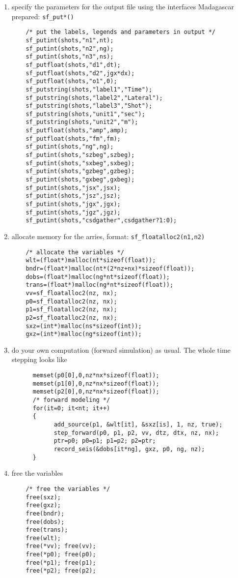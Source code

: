 \begin{enumerate}
 
 \item specify the parameters for the output file using the interfaces Madagascar prepared: \texttt{sf\_put*()}
 \begin{verbatim}
  	/* put the labels, legends and parameters in output */
	sf_putint(shots,"n1",nt);	
	sf_putint(shots,"n2",ng);
	sf_putint(shots,"n3",ns);
	sf_putfloat(shots,"d1",dt);
	sf_putfloat(shots,"d2",jgx*dx);
	sf_putfloat(shots,"o1",0);
	sf_putstring(shots,"label1","Time");
	sf_putstring(shots,"label2","Lateral");
	sf_putstring(shots,"label3","Shot");
	sf_putstring(shots,"unit1","sec");
	sf_putstring(shots,"unit2","m");
	sf_putfloat(shots,"amp",amp);
	sf_putfloat(shots,"fm",fm);
	sf_putint(shots,"ng",ng);
	sf_putint(shots,"szbeg",szbeg);
	sf_putint(shots,"sxbeg",sxbeg);
	sf_putint(shots,"gzbeg",gzbeg);
	sf_putint(shots,"gxbeg",gxbeg);
	sf_putint(shots,"jsx",jsx);
	sf_putint(shots,"jsz",jsz);
	sf_putint(shots,"jgx",jgx);
	sf_putint(shots,"jgz",jgz);
	sf_putint(shots,"csdgather",csdgather?1:0);
 \end{verbatim}


 \item allocate memory for the arries, format: \texttt{sf\_floatalloc2(n1,n2)}
 \begin{verbatim}  
	/* allocate the variables */
	wlt=(float*)malloc(nt*sizeof(float));
	bndr=(float*)malloc(nt*(2*nz+nx)*sizeof(float));
	dobs=(float*)malloc(ng*nt*sizeof(float));
	trans=(float*)malloc(ng*nt*sizeof(float));
	vv=sf_floatalloc2(nz, nx);
	p0=sf_floatalloc2(nz, nx);
	p1=sf_floatalloc2(nz, nx);
	p2=sf_floatalloc2(nz, nx);
	sxz=(int*)malloc(ns*sizeof(int));
	gxz=(int*)malloc(ng*sizeof(int));
 \end{verbatim}

 \item do your own computation (forward simulation) as usual. The whole time stepping looks like
  \begin{verbatim}
	  memset(p0[0],0,nz*nx*sizeof(float));
	  memset(p1[0],0,nz*nx*sizeof(float));
	  memset(p2[0],0,nz*nx*sizeof(float));
	  /* forward modeling */
	  for(it=0; it<nt; it++)
	  {
		    add_source(p1, &wlt[it], &sxz[is], 1, nz, true);			
		    step_forward(p0, p1, p2, vv, dtz, dtx, nz, nx);
		    ptr=p0; p0=p1; p1=p2; p2=ptr;
		    record_seis(&dobs[it*ng], gxz, p0, ng, nz);
	  }  
  \end{verbatim}
  
 \item free the variables
 \begin{verbatim}  
	/* free the variables */
	free(sxz);
	free(gxz);
	free(bndr);
	free(dobs);
	free(trans);
	free(wlt);
	free(*vv); free(vv);
	free(*p0); free(p0);
	free(*p1); free(p1);
	free(*p2); free(p2);


\end{verbatim}
\end{enumerate}
